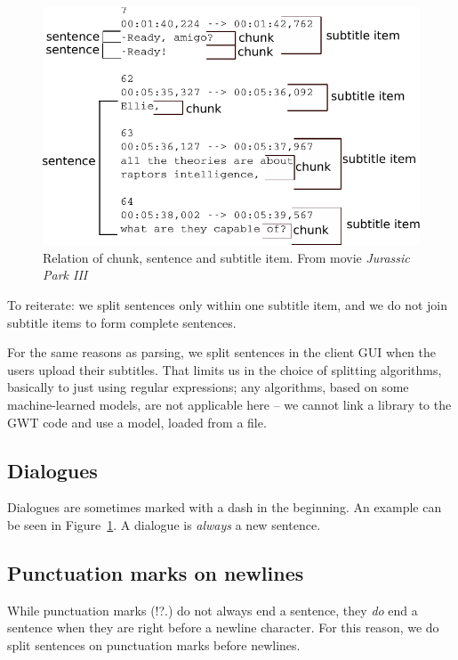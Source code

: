 \begin{figure}[t]
\begin{center}
\includegraphics{figures/chunks.pdf}
\end{center}
\caption{Relation of chunk, sentence and subtitle item. From movie \emph{Jurassic Park III}}\label{splitting:chunks}
\end{figure}

To reiterate: we split sentences only within one subtitle item, and we do not join subtitle items to form complete sentences.

For the same reasons as parsing, we split sentences in the client GUI when the users upload their subtitles. That limits us in the choice of splitting algorithms, basically to just using regular expressions; any algorithms, based on some machine-learned models, are not applicable here -- we cannot link a library to the GWT code and use a model, loaded from a file.

\subsection*{Dialogues}
Dialogues are sometimes marked with a dash in the beginning. An example can be seen in Figure~\ref{splitting:chunks}. A dialogue is \emph{always} a new sentence.

\subsection*{Punctuation marks on newlines}
While punctuation marks (!?.) do not always end a sentence, they \emph{do} end a sentence when they are right before a newline character. For this reason, we do split sentences on punctuation marks before newlines.

